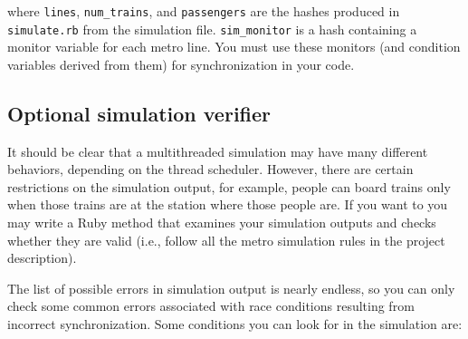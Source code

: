 \documentclass[11pt]{article}
\begin{document}
      \vspace{-2mm}

      \noindent
      where \texttt{lines}, \texttt{num\_trains}, and \texttt{passengers}
      are the hashes produced in \texttt{simulate.rb} from the simulation
      file.  \texttt{sim\_monitor} is a hash containing a monitor variable
      for each metro line. You must use these monitors (and condition
      variables derived from them) for synchronization in your code.

    \subsection{Optional simulation verifier}

      It should be clear that a multithreaded simulation may have many
    different behaviors, depending on the thread scheduler.  However, there
    are certain restrictions on the simulation output, for example, people
    can board trains only when those trains are at the station where those
    people are.  If you want to you may write a Ruby method that examines
    your simulation outputs and checks whether they are valid (i.e., follow
    all the metro simulation rules in the project description).

      The list of possible errors in simulation output is nearly endless, so
    you can only check some common errors associated with race conditions
    resulting from incorrect synchronization.  Some conditions you can look
    for in the simulation are:

      \vspace{-2mm}
\end{document}
